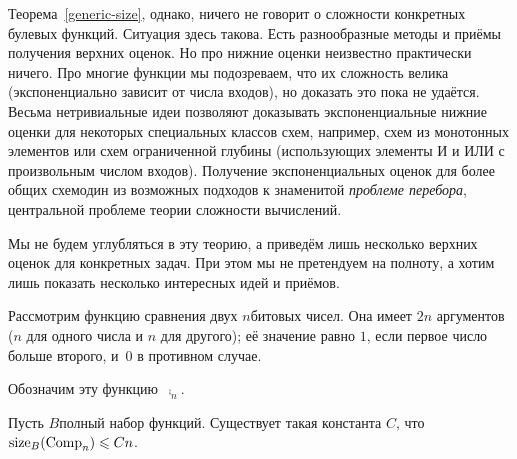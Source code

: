 Теорема~\ref{generic-size}, однако, ничего не говорит о
сложности конкретных булевых функций. Ситуация здесь такова.
Есть разнообразные методы и приёмы получения верхних оценок. Но
про нижние оценки неизвестно практически ничего. Про многие
функции мы подозреваем, что их сложность велика (экспоненциально
зависит от числа входов), но доказать это пока не удаётся.
Весьма нетривиальные идеи позволяют доказывать экспоненциальные
нижние оценки для некоторых специальных классов схем, например,
схем из монотонных элементов или схем ограниченной глубины
(использующих элементы И и ИЛИ с произвольным числом входов).
Получение экспоненциальных оценок для более общих схем\т один из
возможных подходов к знаменитой \emph{проблеме перебора},%
центральной проблеме теории сложности вычислений.

Мы не будем углубляться в эту теорию, а приведём лишь несколько
верхних оценок для конкретных задач. При этом мы не претендуем
на полноту, а хотим лишь показать несколько интересных идей и
приёмов.

Рассмотрим функцию сравнения%
%
двух $n$\д битовых чисел. Она имеет $2n$ аргументов ($n$ для
одного числа и $n$ для другого); её значение равно $1$, если
первое число больше второго, и~$0$ в противном случае.

Обозначим эту функцию~$\comp_n$.%

\begin{theorem}
        \label{recursive-comparing}
Пусть $B$\т полный набор функций. Существует такая
константа $C$, что $\size_B(\comp_n)\hm\le Cn$.
\end{theorem}

